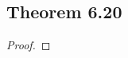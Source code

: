 \documentclass[../../main.tex]{subfiles}
\begin{document}
\subsection{Theorem 6.20}
\begin{wts}

\end{wts}
\begin{proof}

\end{proof}
\end{document}
